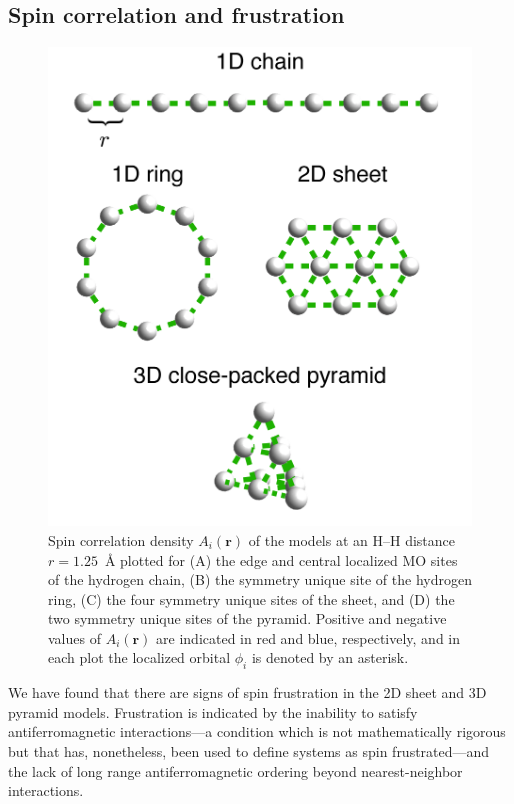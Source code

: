 \documentclass[aip,jcp,amsmath,amssymb, preprint]{revtex4-1}
\begin{document}
\subsection{\label{sec:spin_correlation}Spin correlation and frustration}

\begin{figure}[tbh]
\centering
\includegraphics[width=6in]{figure_3.png}
\caption{Spin correlation density $A_{i}(\mathbf{r})$ of the  models at an H--H distance $r=1.25$~{\AA} plotted for (A) the edge and central localized MO sites of the hydrogen chain, (B) the symmetry unique site of the hydrogen ring, (C) the four symmetry unique sites of the  sheet, and (D) the two symmetry unique sites of the  pyramid. Positive and negative values of $A_{i}(\mathbf{r})$ are indicated in red and blue, respectively, and in each plot the localized orbital $\phi_i$ is denoted by an asterisk.}
\label{fig:spin_correlation}
\end{figure} 

We have found that there are signs of spin frustration in the 2D sheet and 3D pyramid models.
Frustration is indicated by the inability to satisfy antiferromagnetic interactions---a condition which is not mathematically rigorous but that has, nonetheless, been used to define systems as spin frustrated\cite{Baker2012ClassificationOf}---and the lack of long range antiferromagnetic ordering beyond nearest-neighbor interactions.
 
\end{document}
